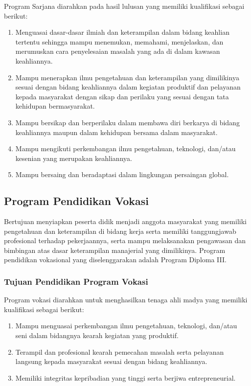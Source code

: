 \documentclass[
]{book}
\providecommand{\tightlist}{%
  \setlength{\itemsep}{0pt}\setlength{\parskip}{0pt}}
\begin{document}
Program Sarjana diarahkan pada hasil lulusan yang memiliki kualifikasi sebagai berikut:

\begin{enumerate}
\def\labelenumi{\arabic{enumi}.}
\tightlist
\item
  Menguasai dasar-dasar ilmiah dan keterampilan dalam bidang keahlian tertentu sehingga mampu menemukan, memahami, menjelaskan, dan merumuskan cara penyelesaian masalah yang ada di dalam kawasan keahliannya.
\item
  Mampu menerapkan ilmu pengetahuan dan keterampilan yang dimilikinya sesuai dengan bidang keahliannya dalam kegiatan produktif dan pelayanan kepada masyarakat dengan sikap dan perilaku yang sesuai dengan tata kehidupan bermasyarakat.
\item
  Mampu bersikap dan berperilaku dalam membawa diri berkarya di bidang keahliannya maupun dalam kehidupan bersama dalam masyarakat.
\item
  Mampu mengikuti perkembangan ilmu pengetahuan, teknologi, dan/atau kesenian yang merupakan keahliannya.
\item
  Mampu bersaing dan beradaptasi dalam lingkungan persaingan global.
\end{enumerate}

\hypertarget{program-pendidikan-vokasi}{%
\subsection{Program Pendidikan Vokasi}\label{program-pendidikan-vokasi}}

Bertujuan menyiapkan peserta didik menjadi anggota masyarakat yang memiliki pengetahuan dan keterampilan di bidang kerja serta memiliki tanggungjawab profesional terhadap pekerjaannya, serta mampu melaksanakan pengawasan dan bimbingan atas dasar keterampilan manajerial yang dimilikinya. Program pendidikan vokasional yang diselenggarakan adalah Program Diploma III.

\hypertarget{tujuan-pendidikan-program-vokasi}{%
\subsubsection{Tujuan Pendidikan Program Vokasi}\label{tujuan-pendidikan-program-vokasi}}

Program vokasi diarahkan untuk menghasilkan tenaga ahli madya yang memiliki kualifikasi sebagai berikut:

\begin{enumerate}
\def\labelenumi{\arabic{enumi}.}
\tightlist
\item
  Mampu menguasai perkembangan ilmu pengetahuan, teknologi, dan/atau seni dalam bidangnya kearah kegiatan yang produktif.
\item
  Terampil dan profesional kearah pemecahan masalah serta pelayanan langsung kepada masyarakat sesuai dengan bidang keahliannya.
\item
  Memiliki integritas kepribadian yang tinggi serta berjiwa entrepreneurial.
\end{enumerate}
\end{document}
